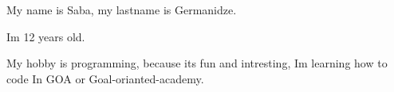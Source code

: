 My name is Saba, my lastname is Germanidze.

Im 12 years old.

My hobby is programming, because its fun and intresting, Im learning how to code In GOA or Goal-orianted-academy.